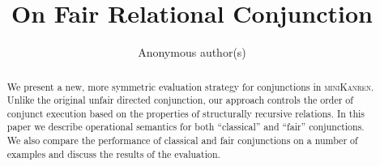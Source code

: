 \documentclass[runningheads]{llncs}
\newcommand{\mk}{\textsc{miniKanren}\xspace}
\begin{document}
\title{On Fair Relational Conjunction}

\author{Anonymous author(s)}

\maketitle

\begin{abstract}
We present a new, more symmetric evaluation strategy for conjunctions in \mk. Unlike the original unfair directed conjunction, our approach controls the order of conjunct execution based on the properties of structurally recursive relations. In this paper we describe operational semantics for both ``classical'' and ``fair'' conjunctions. We also compare the performance of classical and fair conjunctions on a number of examples and discuss the results of the evaluation.
\end{abstract}



\thispagestyle{empty}











\end{document}

